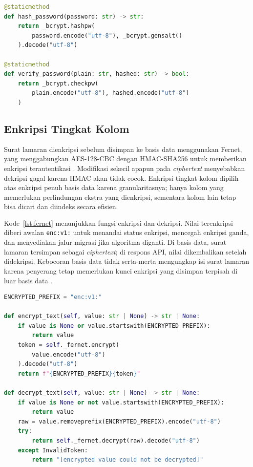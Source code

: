 \documentclass[12pt,a4paper]{article}
\begin{document}
\begin{lstlisting}[language=Python,
  caption={Operasi hashing dan verifikasi kata sandi menggunakan
           bcrypt dengan salt otomatis},
  label={lst:bcrypt}]
@staticmethod
def hash_password(password: str) -> str:
    return _bcrypt.hashpw(
        password.encode("utf-8"), _bcrypt.gensalt()
    ).decode("utf-8")

@staticmethod
def verify_password(plain: str, hashed: str) -> bool:
    return _bcrypt.checkpw(
        plain.encode("utf-8"), hashed.encode("utf-8")
    )
\end{lstlisting}

\subsection{Enkripsi Tingkat Kolom}

Surat lamaran dienkripsi sebelum disimpan ke basis data menggunakan
Fernet, yang menggabungkan AES-128-CBC dengan HMAC-SHA256 untuk
memberikan enkripsi terautentikasi \citep{NIST2001, Katz2014}. Modifikasi
sekecil apapun pada \textit{ciphertext} menyebabkan dekripsi gagal
karena HMAC akan tidak cocok. Enkripsi tingkat kolom dipilih atas
enkripsi penuh basis data karena granularitasnya; hanya kolom yang
memerlukan perlindungan ekstra yang dienkripsi, sementara kolom lain
tetap bisa dicari dan diindeks secara efisien.

Kode~\ref{lst:fernet} menunjukkan fungsi enkripsi dan dekripsi. Nilai
terenkripsi diberi awalan \texttt{enc:v1:} untuk menandai status
enkripsi, mencegah enkripsi ganda, dan menyediakan jalur migrasi jika
algoritma diganti. Di basis data, surat lamaran tersimpan sebagai
\textit{ciphertext}; di respons API, nilai dikembalikan setelah
didekripsi. Kebocoran basis data tidak serta-merta mengungkap isi surat
lamaran karena penyerang tetap memerlukan kunci enkripsi yang disimpan
terpisah di luar basis data \citep{Cryptography2024}.

\begin{lstlisting}[language=Python,
  caption={Enkripsi tingkat kolom Fernet dengan awalan versi
           untuk migrasi algoritma yang aman},
  label={lst:fernet}]
ENCRYPTED_PREFIX = "enc:v1:"

def encrypt_text(self, value: str | None) -> str | None:
    if value is None or value.startswith(ENCRYPTED_PREFIX):
        return value
    token = self._fernet.encrypt(
        value.encode("utf-8")
    ).decode("utf-8")
    return f"{ENCRYPTED_PREFIX}{token}"

def decrypt_text(self, value: str | None) -> str | None:
    if value is None or not value.startswith(ENCRYPTED_PREFIX):
        return value
    raw = value.removeprefix(ENCRYPTED_PREFIX).encode("utf-8")
    try:
        return self._fernet.decrypt(raw).decode("utf-8")
    except InvalidToken:
        return "[encrypted value could not be decrypted]"
\end{lstlisting}
\end{document}

